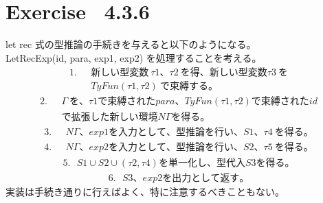 \documentclass{jreport}
\begin{document}
\section{Exercise \ 4.3.6}
let rec 式の型推論の手続きを与えると以下のようになる。\\
LetRecExp(id, para, exp1, exp2) を処理することを考える。
\begin{equation}
  \begin{split}
    1. \ \ \ &新しい型変数 \ \tau1 、\tau2 \  を得、新しい型変数 \tau3 \ を \\ &
    TyFun(\tau1, \tau2) \ で束縛する。
  \end{split}
\end{equation}
\begin{equation}
  \begin{split}
    2. \ \ \ &\Gamma \ を、 \tau1  で束縛された para 、TyFun(\tau1, \tau2) で束縛された id \\ &
    で拡張した新しい環境 N\Gamma を得る。
  \end{split}
\end{equation}
\begin{equation}
  \begin{split}
    3. \ \ \ &N\Gamma 、exp1 を入力として、型推論を行い、S1、\tau4 \ を得る。
  \end{split}
\end{equation}
\begin{equation}
  \begin{split}
    4. \ \ \ &N\Gamma 、exp2 を入力として、型推論を行い、S2、\tau5 \ を得る。
  \end{split}
\end{equation}
\begin{equation}
  \begin{split}
    5. \ \ \ S1 \cup S2 \cup (\tau2, \tau4) を単一化し、型代入S3を得る。
  \end{split}
\end{equation}
\begin{equation}
  \begin{split}
    6. \ \ \ S3、exp2 を出力として返す。
  \end{split}
\end{equation}
実装は手続き通りに行えばよく、特に注意するべきこともない。
\end{document}
